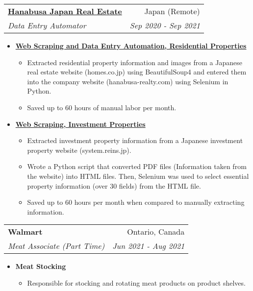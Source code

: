 \documentclass[letterpaper,11pt]{article}
\makeatletter
\newcommand{\resumeItem}[2]{
  \item\small{
    \textbf{#1}{ #2 \vspace{-2pt}}
  }
}
\newcommand{\resumeSubheading}[4]{
  \vspace{-1pt}\item
    \begin{tabular*}{0.97\textwidth}{l@{\extracolsep{\fill}}r}
      \textbf{#1} & #2 \\
      \textit{\small#3} & \textit{\small #4} \\
    \end{tabular*}\vspace{-5pt}
}
\newcommand{\resumeItemListStart}{\begin{itemize}}
\newcommand{\resumeItemListEnd}{\end{itemize}\vspace{-5pt}}
\makeatother
\begin{document}
    \resumeSubheading
      {\href{https://hanabusa-realty.com/}{Hanabusa Japan Real Estate}}{Japan (Remote)}
      {Data Entry Automator}{Sep 2020 - Sep 2021}
      \resumeItemListStart
        \resumeItem{\href{https://github.com/pl3lee/Hanabusa-Automation}{Web Scraping and Data Entry Automation, Residential Properties}}
        {\begin{itemize}
            \item Extracted residential property information and images from a Japanese real estate website (homes.co.jp) using BeautifulSoup4 and entered them into the company website (hanabusa-realty.com) using Selenium in Python.
            \item Saved up to 60 hours of manual labor per month.
        \end{itemize}}
        \resumeItem{\href{https://github.com/pl3lee/Reins-Automation}{Web Scraping, Investment Properties}}
        {\begin{itemize}
            \item Extracted investment property information from a Japanese investment property website (system.reins.jp).
            \item Wrote a Python script that converted PDF files (Information taken from the website) into HTML files. Then, Selenium was used to select essential property information (over 30 fields) from the HTML file.
            \item Saved up to 60 hours per month when compared to manually extracting information.
        \end{itemize}}
      \resumeItemListEnd

    \resumeSubheading
      {Walmart}{Ontario, Canada}
      {Meat Associate (Part Time)}{Jun 2021 - Aug 2021}
      \resumeItemListStart
        \resumeItem{Meat Stocking}
          {\begin{itemize}
            \item Responsible for stocking and rotating meat products on product shelves.
          \end{itemize}}
      \resumeItemListEnd
\end{document}
